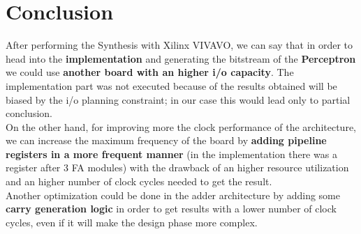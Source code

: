 \section{Conclusion}
After performing the Synthesis with Xilinx VIVAVO, we can say that in order to head into the \textbf{implementation} and generating the bitstream of the \textbf{Perceptron} we could use \textbf{another board with an higher i/o capacity}. The implementation part was not executed because of the results obtained will be biased by the i/o planning constraint; in our case this would lead only to partial conclusion.\\
On the other hand, for improving more the clock performance of the architecture, we can increase the maximum frequency of the board by \textbf{adding pipeline registers in a more frequent manner} (in the implementation there was a register after 3 FA modules) with the drawback of an higher resource utilization and an higher number of clock cycles needed to get the result.\\
Another optimization could be done in the adder architecture by adding some \textbf{carry generation logic} in order to get results with a lower number of clock cycles, even if it will make the design phase more complex.